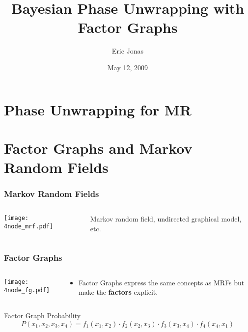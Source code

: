 \documentclass{beamer}
\title{Bayesian Phase Unwrapping with Factor Graphs}
\author{Eric Jonas}
\date{May 12, 2009}
\institute[6.556]{6.556 Final Project}
\begin{document}
\begin{frame}
\maketitle
\end{frame}

\section{Phase Unwrapping for MR}
\begin{frame}

\end{frame}

\section{Factor Graphs and Markov Random Fields}
\begin{frame}
  \frametitle{Markov Random Fields}
  \begin{columns}
    \begin{column}{5cm}
      \texttt{[image: 4node\_mrf.pdf]}
    \end{column}
    \begin{column}{5cm}
      Markov random field, undirected graphical model, etc. 
    \end{column}
  \end{columns}
\end{frame}

\begin{frame}
  \frametitle{Factor Graphs}
  \begin{columns}
    \begin{column}{5cm}
      \texttt{[image: 4node\_fg.pdf]}
    \end{column}
    \begin{column}{5cm}
      \begin{itemize}
        \item Factor Graphs \cite{Kschischang_Factor_01} express the same concepts
          as MRFs but make the \textbf{factors} explicit. 
        \end{itemize}
    \end{column}
  \end{columns}
  \begin{block}{Factor Graph Probability}
    \begin{equation}
      P(x_1, x_2, x_3, x_4) = f_1(x_1, x_2) \cdot f_2(x_2, x_3) \cdot f_3(x_3, x_4) \cdot f_4(x_4, x_1)
    \end{equation}
  \end{block}
\end{frame}
\end{document}
